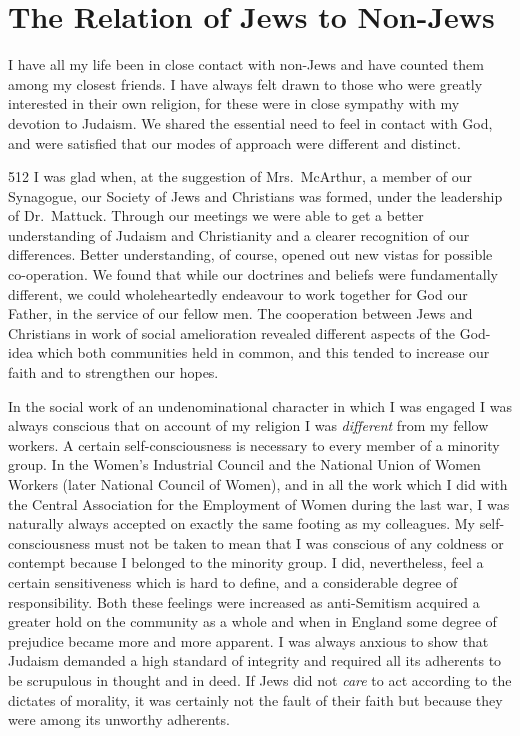 \chapter{The Relation of Jews to Non-Jews}

I have all my life been in close contact with
non-Jews and have counted them among my closest friends.
I have always felt drawn to those who were greatly
interested in their own religion, for these were in close
sympathy with my devotion to Judaism. We shared the
essential need to feel in contact with God, and were
satisfied that our modes of approach were different and
distinct.

\begin{tp}{512}
I was glad when, at the suggestion of Mrs.\ McArthur,
a member of our Synagogue, our Society of Jews and
Christians was formed, under the leadership of
Dr.\ Mattuck. Through our meetings we were able to get a
better understanding of Judaism and Christianity and a
clearer recognition of our differences. Better
understanding, of course, opened out new vistas for possible
co-operation. We found that while our doctrines and
beliefs were fundamentally different, we could
wholeheartedly endeavour to work together for God our
Father, in the service of our fellow men. The
cooperation between Jews and Christians in work of social
amelioration revealed different aspects of the God-idea
which both communities held in common, and this
tended to increase our faith and to strengthen our hopes.
\end{tp}

In the social work of an undenominational character
in which I was engaged I was always conscious that on
account of my religion I was \textsl{different} from my fellow
workers. A certain self-consciousness is necessary to
every member of a minority group. In the Women’s
Industrial Council and the National Union of Women
Workers (later National Council of Women), and in all
the work which I did with the Central Association for the
Employment of Women during the last war, I was
naturally always accepted on exactly the same footing as
my colleagues. My self-consciousness must not be taken
to mean that I was conscious of any coldness or contempt
because I belonged to the minority group. I did,
nevertheless, feel a certain sensitiveness which is hard to define,
and a considerable degree of responsibility. Both these
feelings were increased as anti-Semitism acquired a
greater hold on the community as a whole and when in
England some degree of prejudice became more and more
apparent. I was always anxious to show that Judaism
demanded a high standard of integrity and required all
its adherents to be scrupulous in thought and in deed.
If Jews did not \textsl{care} to act according to the dictates of
morality, it was certainly not the fault of their faith but
because they were among its unworthy adherents.

